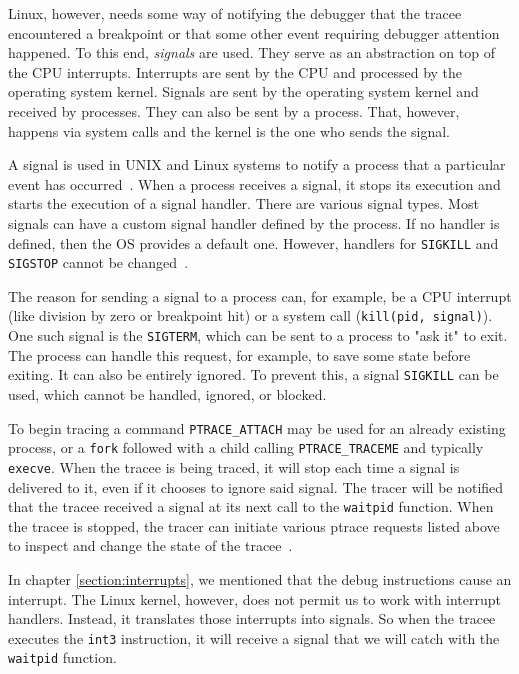 Linux, however, needs some way of notifying the debugger that the tracee
encountered a breakpoint or that some other event requiring debugger attention
happened. To this end, \textit{signals} are used. They serve as an abstraction
on top of the CPU interrupts. Interrupts are sent by the CPU and processed by
the operating system kernel. Signals are sent by the operating system kernel
and received by processes. They can also be sent by a process. That, however,
happens via system calls and the kernel is the one who sends the signal.

A signal is used in UNIX and Linux systems to notify a process that a
particular event has occurred~\cite{os-concepts}. When a process receives a
signal, it stops its execution and starts the execution of a signal handler.
There are various signal types. Most signals can have a custom signal handler
defined by the process. If no handler is defined, then the OS provides a
default one. However, handlers for \texttt{SIGKILL} and \texttt{SIGSTOP} cannot
be changed~\cite{signals}.

The reason for sending a signal to a process can, for example, be a CPU
interrupt (like division by zero or breakpoint hit) or a system call
(\texttt{kill(pid, signal)}). One such signal is the \texttt{SIGTERM}, which
can be sent to a process to "ask it" to exit. The process can handle this
request, for example, to save some state before exiting. It can also be
entirely ignored. To prevent this, a signal \texttt{SIGKILL} can be used, which
cannot be handled, ignored, or blocked.

To begin tracing a command \texttt{PTRACE\_ATTACH} may be used for an already
existing process, or a \texttt{fork} followed with a child calling
\texttt{PTRACE\_TRACEME} and typically \texttt{execve}. When the tracee is
being traced, it will stop each time a signal is delivered to it, even if it
chooses to ignore said signal. The tracer will be notified that the tracee
received a signal at its next call to the \texttt{waitpid} function. When the
tracee is stopped, the tracer can initiate various ptrace requests listed above
to inspect and change the state of the tracee~\cite{ptrace}.

In chapter \ref{section:interrupts}, we mentioned that the debug instructions
cause an interrupt. The Linux kernel, however, does not permit us to work with
interrupt handlers. Instead, it translates those interrupts into signals. So
when the tracee executes the \texttt{int3} instruction, it will receive a
signal that we will catch with the \texttt{waitpid} function.

